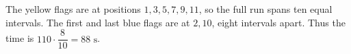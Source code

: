 The yellow flags are at positions $1,3,5,7,9,11$, so the full run spans ten equal intervals. The first and last blue flags are at $2,10$, eight intervals apart. Thus the time is $110\cdot\dfrac{8}{10}=\boxed{88\text{ s}}$.
